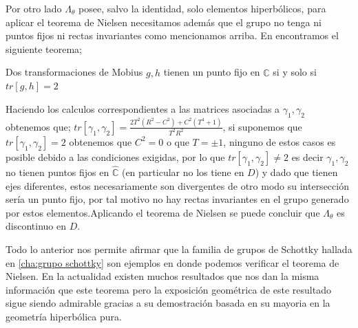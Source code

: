  Por otro lado $\Lambda_{\theta}$ posee, salvo la identidad, solo elementos hiperb\'olicos, para aplicar el teorema de Nielsen necesitamos adem\'as que el grupo no tenga ni puntos fijos ni rectas invariantes como mencionamos arriba. En \cite{Beardon} encontramos el siguiente teorema;

\begin{thm}
 Dos transformaciones de Mobius $g,h$ tienen un punto fijo en $\widehat{\mathbb{C}}$ si y solo si $tr[g,h]=2$
\end{thm}

 Haciendo los calculos correspondientes a las matrices asociadas a $\gamma_{1},\gamma_{2}$ obtenemos que; $tr[\gamma_{1},\gamma_{2}] = \frac{2T^{2}(R^{2}-C^{2}) + C^{2}(T^{4} +1)}{T^{2}R^{2}}$, si suponemos que $tr[\gamma_{1},\gamma_{2}]=2$ obtenemos que $C^{2}=0$ o que $T= \pm 1$, ninguno de estos casos es posible debido a las condiciones exigidas, por lo que $tr[\gamma_{1},\gamma_{2}] \neq 2$ es decir $\gamma_{1},\gamma_{2}$  no tienen puntos fijos en $\widehat{\mathbb{C}}$ (en particular no los tiene en $D$) y dado que tienen ejes diferentes, estos necesariamente son divergentes de otro modo su intersecci\'on ser\'ia un punto fijo, por tal motivo no hay rectas invariantes en el grupo generado por estos elementos.Aplicando el teorema de Nielsen se puede concluir que $\Lambda_{\theta}$ es discontinuo en $D$.

Todo lo anterior nos permite afirmar que la familia de  grupos de Schottky hallada en \ref{cha:grupo schottky} son ejemplos en donde podemos verificar el teorema de Nielsen. En la actualidad existen muchos resultados que nos dan la misma informaci\'on que este teorema pero la exposici\'on geom\'etrica de este resultado sigue siendo admirable gracias a su demostraci\'on basada en su mayoria en la geometr\'ia hiperb\'olica pura.



